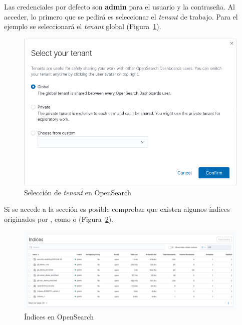 Las credenciales por defecto son \textbf{admin} para el usuario y la contraseña. Al acceder, lo primero que se pedirá es seleccionar el \emph{tenant} de trabajo. Para el ejemplo se seleccionará el \emph{tenant} global (Figura~\ref{fig:opensearch-tenant}).

\begin{figure}[ht]
    \centering
    \includegraphics[width=\textwidth]{Figures/opensearch-tenant.png}
    \decoRule
    \caption[OpenSearch (Selección de \emph{tenant})]{Selección de \emph{tenant} en OpenSearch}
    \label{fig:opensearch-tenant}
\end{figure}

Si se accede a la sección  es posible comprobar que existen algunos índices originados por , como  o  (Figura~\ref{fig:opensearch-indices}).

\begin{figure}[ht]
    \centering
    \includegraphics[width=\textwidth]{Figures/opensearch-indices.png}
    \decoRule
    \caption[OpenSearch (Índices)]{Índices en OpenSearch}
    \label{fig:opensearch-indices}
\end{figure}

